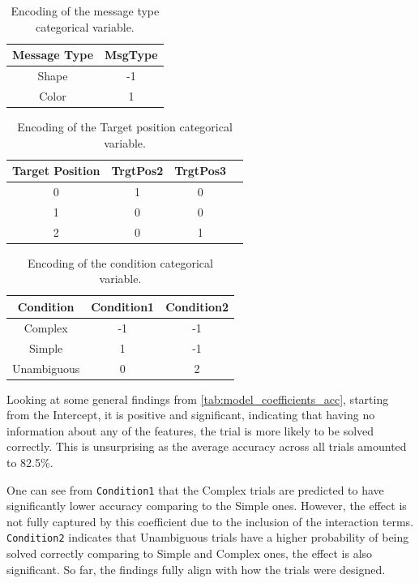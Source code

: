 \begin{table}[h!]
    \centering
    \begin{tabular}{|c|c|}
    \hline
    Message Type & MsgType \\ \hline
    Shape        & -1       \\ \hline
    Color        & 1        \\ \hline
    \end{tabular}
    \caption{Encoding of the message type categorical variable.}
    \label{tab:msgtype_encoding}
    \end{table}
    \hfill
    \begin{table}[h!]
    \centering
    \begin{tabular}{|c|c|c|c|}
    \hline
    Target Position & TrgtPos2 & TrgtPos3\\ \hline
    0               & 1    & 0    \\ \hline
    1               & 0    & 0    \\ \hline
    2               & 0    & 1    \\ \hline
    \end{tabular}
    \caption{Encoding of the Target position categorical variable.}
    \label{tab:trgtpos_encoding}
    \end{table}
    \begin{table}[h!]
    \centering
    \begin{tabular}{|c|c|c|}
    \hline
    Condition     & Condition1 & Condition2 \\ \hline
    Complex       & -1   & -1   \\ \hline
    Simple        & 1    & -1   \\ \hline
    Unambiguous   & 0    & 2    \\ \hline
    \end{tabular}
    \caption{Encoding of the condition categorical variable.}
    \label{tab:condition_encoding}
\end{table}


Looking at some general findings from \autoref{tab:model_coefficients_acc}, starting from the Intercept, it is positive and significant, indicating that having no information about any of the features, the trial is more likely to be solved correctly. This is unsurprising as the average accuracy across all trials amounted to 82.5\%. 

One can see from \texttt{Condition1} that the Complex trials are predicted to have significantly lower accuracy comparing to the Simple ones. However, the effect is not fully captured by this coefficient due to the inclusion of the interaction terms. \texttt{Condition2} indicates that Unambiguous trials have a higher probability of being solved correctly comparing to Simple and Complex ones, the effect is also significant. So far, the findings fully align with how the trials were designed. 

